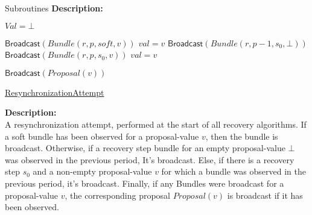 \documentclass[10pt,a4paper]{article}
\begin{document}
\begin{section}{Subroutines}
\noindent \textbf{Description:}\\


\begin{algorithm}[H]\label{algo:resynchronization-attempt}
    \begin{algorithmic}[1]


    \State $Val = \bot$

        \State $\mathsf{Broadcast}(Bundle(r, p, soft, v))$
        \State $val = v$    
        \State $\mathsf{Broadcast}(Bundle(r, p - 1, s_0, \bot))$
        \State $\mathsf{Broadcast}(Bundle(r, p, s_0, v))$
        \State $val = v$
    \EndIf

        \State $\mathsf{Broadcast}(Proposal(v))$
    \EndIf

    \EndFunction
    \end{algorithmic}
    \caption{\underline{ResynchronizationAttempt}}
\end{algorithm}

\noindent \textbf{Description:}\\
A resynchronization attempt, performed at the start of all recovery algorithms.
If a soft bundle has been observed for a proposal-value $v$, then the bundle is broadcast.
Otherwise, if a recovery step bundle for an empty proposal-value $\bot$ was observed in the previous period,
It's broadcast.
Else, if there is a recovery step $s_0$ and a non-empty proposal-value $v$ for which a bundle was observed in the previous
period, it's broadcast.
Finally, if any Bundles were broadcast for a proposal-value $v$, the corresponding proposal $Proposal(v)$ is broadcast
if it has been observed.



\end{section}
\end{document}
